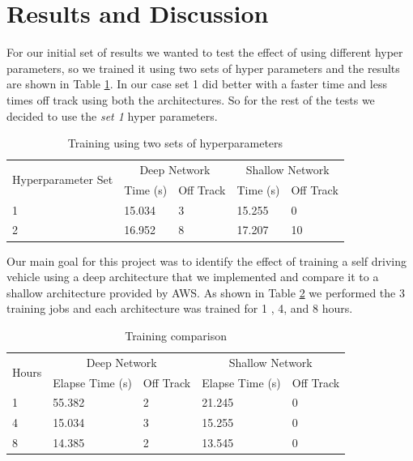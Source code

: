 \documentclass[journal]{IEEEtran}
\begin{document}
\section{Results and Discussion}
For our initial set of results we wanted to test the effect of using different hyper parameters, so we trained it using two sets of hyper parameters and the results are shown in Table \ref{twoHyperSets}.  In our case set 1 did better with a faster time and less times off track using both the architectures.  So for the rest of the tests we decided to use the \emph{set 1} hyper parameters.

\begin{table}
\centering
\caption{Training using two sets of hyperparameters}
\begin{tabular}{ |p{2.5cm}|p{1cm}|p{1cm}|p{1cm}|p{1cm}|  }
\hline
\multirow{2}{4em}{Hyperparameter Set} & \multicolumn{2}{|c|}{Deep Network} & \multicolumn{2}{|c|}{Shallow Network} \\
\cline{2-5}
 & Time (s) & Off Track & Time (s) & Off Track \\
\hline
1 & 15.034 & 3  & 15.255 & 0 \\
\hline
 2 & 16.952 & 8  & 17.207 & 10 \\
\hline
\end{tabular}
\label{twoHyperSets}
\end{table}

Our main goal for this project was to identify the effect of training a self driving vehicle using a deep architecture that we implemented and compare it to a shallow architecture provided by AWS.  As shown in Table \ref{mainTest} we performed the 3 training jobs and each architecture was trained for 1 , 4, and 8 hours. 

\begin{table}[t]
\centering
\caption{Training comparison}
\begin{tabular}{ |p{1cm}|p{1.25cm}|p{1cm}|p{1.25cm}|p{1cm}| }
\hline
 \multirow{2}{*}{Hours} & \multicolumn{2}{|c|}{Deep Network} & \multicolumn{2}{|c|}{Shallow Network} \\
\cline{2-5}
 & Elapse Time (s) & Off Track &  Elapse Time (s) & Off Track  \\
\hline
\multirow{1}{4em}{1} & 55.382 & 2 & 21.245 & 0 \\ 
 \hline
\multirow{1}{4em}{4} & 15.034& 3 & 15.255 & 0 \\ 
 \hline
\multirow{1}{4em}{8} & 14.385& 2 & 13.545 & 0 \\ 
 \hline
\end{tabular}
\label{mainTest}
\end{table}
\end{document}
